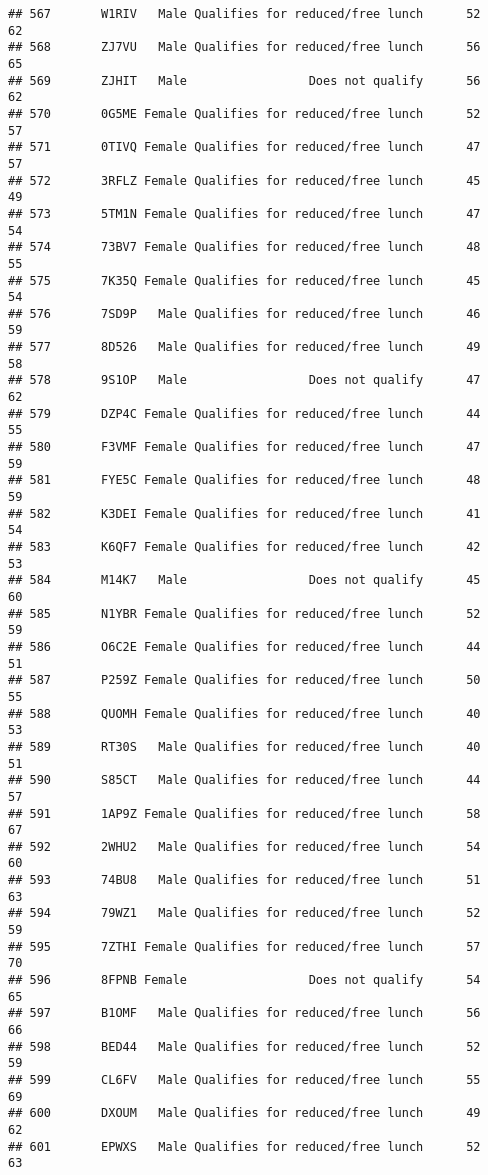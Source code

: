 \documentclass[
]{article}
\begin{document}
\begin{verbatim}
## 567       W1RIV   Male Qualifies for reduced/free lunch      52       62
## 568       ZJ7VU   Male Qualifies for reduced/free lunch      56       65
## 569       ZJHIT   Male                 Does not qualify      56       62
## 570       0G5ME Female Qualifies for reduced/free lunch      52       57
## 571       0TIVQ Female Qualifies for reduced/free lunch      47       57
## 572       3RFLZ Female Qualifies for reduced/free lunch      45       49
## 573       5TM1N Female Qualifies for reduced/free lunch      47       54
## 574       73BV7 Female Qualifies for reduced/free lunch      48       55
## 575       7K35Q Female Qualifies for reduced/free lunch      45       54
## 576       7SD9P   Male Qualifies for reduced/free lunch      46       59
## 577       8D526   Male Qualifies for reduced/free lunch      49       58
## 578       9S1OP   Male                 Does not qualify      47       62
## 579       DZP4C Female Qualifies for reduced/free lunch      44       55
## 580       F3VMF Female Qualifies for reduced/free lunch      47       59
## 581       FYE5C Female Qualifies for reduced/free lunch      48       59
## 582       K3DEI Female Qualifies for reduced/free lunch      41       54
## 583       K6QF7 Female Qualifies for reduced/free lunch      42       53
## 584       M14K7   Male                 Does not qualify      45       60
## 585       N1YBR Female Qualifies for reduced/free lunch      52       59
## 586       O6C2E Female Qualifies for reduced/free lunch      44       51
## 587       P259Z Female Qualifies for reduced/free lunch      50       55
## 588       QUOMH Female Qualifies for reduced/free lunch      40       53
## 589       RT30S   Male Qualifies for reduced/free lunch      40       51
## 590       S85CT   Male Qualifies for reduced/free lunch      44       57
## 591       1AP9Z Female Qualifies for reduced/free lunch      58       67
## 592       2WHU2   Male Qualifies for reduced/free lunch      54       60
## 593       74BU8   Male Qualifies for reduced/free lunch      51       63
## 594       79WZ1   Male Qualifies for reduced/free lunch      52       59
## 595       7ZTHI Female Qualifies for reduced/free lunch      57       70
## 596       8FPNB Female                 Does not qualify      54       65
## 597       B1OMF   Male Qualifies for reduced/free lunch      56       66
## 598       BED44   Male Qualifies for reduced/free lunch      52       59
## 599       CL6FV   Male Qualifies for reduced/free lunch      55       69
## 600       DXOUM   Male Qualifies for reduced/free lunch      49       62
## 601       EPWXS   Male Qualifies for reduced/free lunch      52       63

\end{verbatim}
\end{document}
